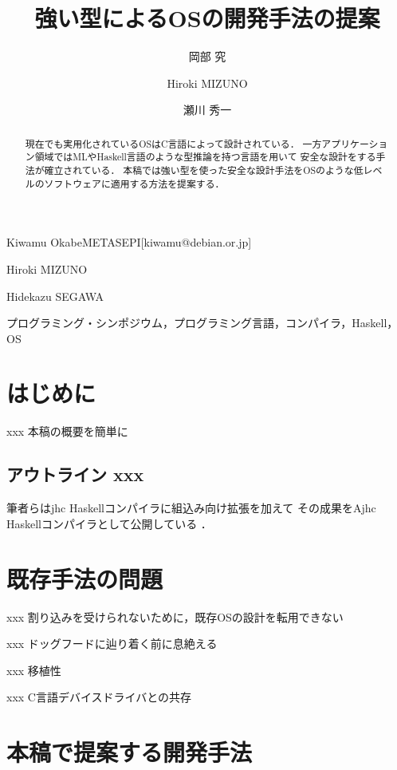 \documentclass[submit,techreq,noauthor]{ipsj}
\begin{document}
\title{強い型によるOSの開発手法の提案}


\author{岡部 究}{Kiwamu Okabe}{METASEPI}[kiwamu@debian.or.jp]
\author{Hiroki MIZUNO}{Hiroki MIZUNO}{}
\author{瀬川 秀一}{Hidekazu SEGAWA}{}

\begin{abstract}
現在でも実用化されているOSはC言語によって設計されている．
一方アプリケーション領域ではMLやHaskell言語のような型推論を持つ言語を用いて
安全な設計をする手法が確立されている．
本稿では強い型を使った安全な設計手法をOSのような低レベルのソフトウェアに適用する方法を提案する．
\end{abstract}

\begin{jkeyword}
プログラミング・シンポジウム，プログラミング言語，コンパイラ，Haskell，OS
\end{jkeyword}

\maketitle

\section{はじめに}

xxx 本稿の概要を簡単に

\subsection{アウトライン xxx}

筆者らはjhc Haskellコンパイラに組込み向け拡張を加えて \cite{j-ikamusume5}
その成果をAjhc Haskellコンパイラとして公開している \cite{ajhc} ．

\section{既存手法の問題}

xxx 割り込みを受けられないために，既存OSの設計を転用できない

xxx ドッグフードに辿り着く前に息絶える

xxx 移植性

xxx C言語デバイスドライバとの共存

\section{本稿で提案する開発手法}
\end{document}

